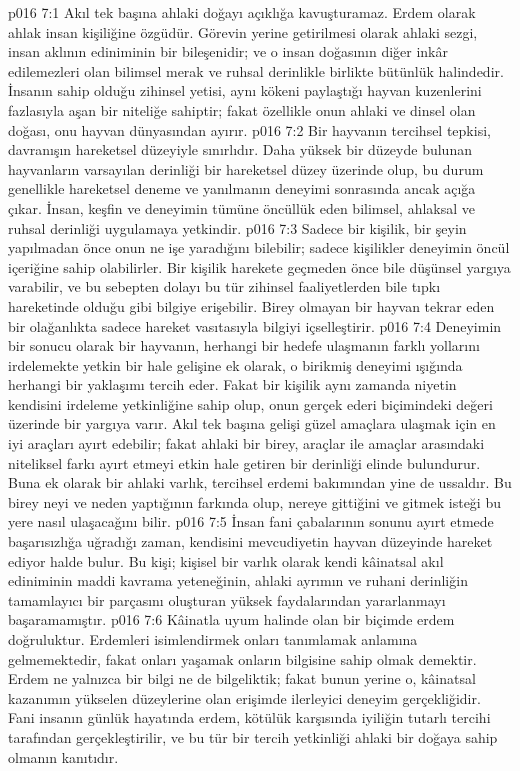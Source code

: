 \vs p016 7:1 Akıl tek başına ahlaki doğayı açıklığa kavuşturamaz. Erdem olarak ahlak insan kişiliğine özgüdür. Görevin yerine getirilmesi olarak ahlaki sezgi, insan aklının ediniminin bir bileşenidir; ve o insan doğasının diğer inkâr edilemezleri olan bilimsel merak ve ruhsal derinlikle birlikte bütünlük halindedir. İnsanın sahip olduğu zihinsel yetisi, aynı kökeni paylaştığı hayvan kuzenlerini fazlasıyla aşan bir niteliğe sahiptir; fakat özellikle onun ahlaki ve dinsel olan doğası, onu hayvan dünyasından ayırır.
\vs p016 7:2 Bir hayvanın tercihsel tepkisi, davranışın hareketsel düzeyiyle sınırlıdır. Daha yüksek bir düzeyde bulunan hayvanların varsayılan derinliği bir hareketsel düzey üzerinde olup, bu durum genellikle hareketsel deneme ve yanılmanın deneyimi sonrasında ancak açığa çıkar. İnsan, keşfin ve deneyimin tümüne öncüllük eden bilimsel, ahlaksal ve ruhsal derinliği uygulamaya yetkindir.
\vs p016 7:3 Sadece bir kişilik, bir şeyin yapılmadan önce onun ne işe yaradığını bilebilir; sadece kişilikler deneyimin öncül içeriğine sahip olabilirler. Bir kişilik harekete geçmeden önce bile düşünsel yargıya varabilir, ve bu sebepten dolayı bu tür zihinsel faaliyetlerden bile tıpkı hareketinde olduğu gibi bilgiye erişebilir. Birey olmayan bir hayvan tekrar eden bir olağanlıkta sadece hareket vasıtasıyla bilgiyi içselleştirir.
\vs p016 7:4 Deneyimin bir sonucu olarak bir hayvanın, herhangi bir hedefe ulaşmanın farklı yollarını irdelemekte yetkin bir hale gelişine ek olarak, o birikmiş deneyimi ışığında herhangi bir yaklaşımı tercih eder. Fakat bir kişilik aynı zamanda niyetin kendisini irdeleme yetkinliğine sahip olup, onun gerçek ederi biçimindeki değeri üzerinde bir yargıya varır. Akıl tek başına gelişi güzel amaçlara ulaşmak için en iyi araçları ayırt edebilir; fakat ahlaki bir birey, araçlar ile amaçlar arasındaki niteliksel farkı ayırt etmeyi etkin hale getiren bir derinliği elinde bulundurur. Buna ek olarak bir ahlaki varlık, tercihsel erdemi bakımından yine de ussaldır. Bu birey neyi ve neden yaptığının farkında olup, nereye gittiğini ve gitmek isteği bu yere nasıl ulaşacağını bilir.
\vs p016 7:5 İnsan fani çabalarının sonunu ayırt etmede başarısızlığa uğradığı zaman, kendisini mevcudiyetin hayvan düzeyinde hareket ediyor halde bulur. Bu kişi; kişisel bir varlık olarak kendi kâinatsal akıl ediniminin maddi kavrama yeteneğinin, ahlaki ayrımın ve ruhani derinliğin tamamlayıcı bir parçasını oluşturan yüksek faydalarından yararlanmayı başaramamıştır.
\vs p016 7:6 Kâinatla uyum halinde olan bir biçimde erdem doğruluktur. Erdemleri isimlendirmek onları tanımlamak anlamına gelmemektedir, fakat onları yaşamak onların bilgisine sahip olmak demektir. Erdem ne yalnızca bir bilgi ne de bilgeliktik; fakat bunun yerine o, kâinatsal kazanımın yükselen düzeylerine olan erişimde ilerleyici deneyim gerçekliğidir. Fani insanın günlük hayatında erdem, kötülük karşısında iyiliğin tutarlı tercihi tarafından gerçekleştirilir, ve bu tür bir tercih yetkinliği ahlaki bir doğaya sahip olmanın kanıtıdır.
